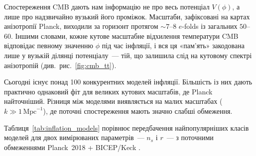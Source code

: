 \documentclass[12pt, a4paper]{article}
\begin{document}
Спостереження CMB дають нам інформацію не про весь потенціал
$V(\phi)$, а лише про надзвичайно вузький його проміжок. Масштаби,
зафіксовані на картах анізотропії Planck, виходили за горизонт
протягом $\sim\!7$--$8$ $e$-folds із загальних $50$--$60$. Іншими
словами, кожне кутове масштабне відхилення температури CMB
відповідає певному значенню $\phi$ під час інфляції, і вся ця
«пам'ять» закодована лише у вузькій ділянці потенціалу~---
тій, що залишила слід на кутовому спектрі анізотропій
(див.\ рис.~\ref{fig:cmb_tt}).


Сьогодні існує понад 100 конкурентних моделей інфляції.
Більшість із них дають практично однаковий фіт для великих
кутових масштабів, де Planck найточніший. Різниця між
моделями виявляється на малих масштабах
($k \gg 1\,\mathrm{Mpc}^{-1}$), де поточні спостереження
мають значно слабші обмеження.

Таблиця~\ref{tab:inflation_models} порівнює передбачення
найпопулярніших класів моделей для двох вимірюваних
параметрів~--- $n_s$ і $r$~--- з поточними обмеженнями
Planck~2018 \cite{planck_2018} + BICEP/Keck \cite{bicep_keck_2021}.
\end{document}
